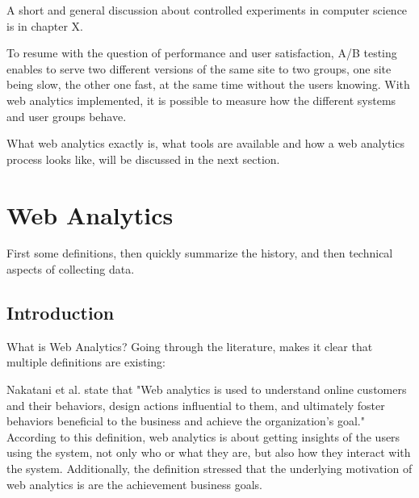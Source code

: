 A short and general discussion about controlled experiments in computer science is in chapter X. %



To resume with the question of performance and user satisfaction,  A/B testing enables to serve two different versions of the same site to two groups, one site being slow, the other one fast, at the same time without the users knowing.
With web analytics implemented, it is possible to measure how the different systems and user groups behave.

What web analytics exactly is, what tools are available and how a web analytics process looks like, will be discussed in the next section.













\section{Web Analytics}

First some definitions, then quickly summarize the history, and then technical aspects of collecting data.


\subsection{Introduction}

What is Web Analytics?
Going through the literature, makes it clear that multiple definitions are existing:

Nakatani et al. state that "Web analytics is used to understand online customers and their behaviors, design actions influential to them, and ultimately foster behaviors beneficial to the business and achieve the organization's goal." %
According to this definition, web analytics is about getting insights of the users using the system, not only who or what they are, but also how they interact with the system.
Additionally, the definition stressed that the underlying motivation of web analytics is are the achievement business goals.

